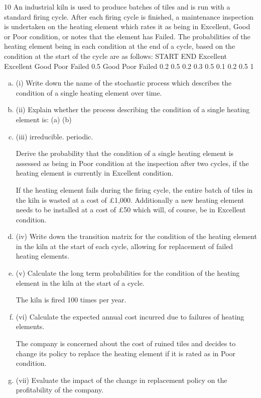 \documentclass[a4paper,12pt]{article}
\begin{document}
\begin{enumerate}
10
An industrial kiln is used to produce batches of tiles and is run with a standard firing cycle. After each firing cycle is finished, a maintenance inspection is undertaken on the heating element which rates it as being in Excellent, Good or Poor condition, or
notes that the element has Failed.
The probabilities of the heating element being in each condition at the end of a cycle,
based on the condition at the start of the cycle are as follows:
START
END
Excellent
Excellent
Good
Poor
Failed
0.5
Good Poor Failed
0.2
0.5 0.2
0.3
0.5 0.1
0.2
0.5
1

\begin{enumerate}[(a)]
\item (i) Write down the name of the stochastic process which describes the condition of a single heating element over time.

\item (ii) Explain whether the process describing the condition of a single heating
element is:
(a)
(b)
\item (iii)
irreducible.
periodic.

Derive the probability that the condition of a single heating element is assessed as being in Poor condition at the inspection after two cycles, if the heating element is currently in Excellent condition.

If the heating element fails during the firing cycle, the entire batch of tiles in the kiln is wasted at a cost of £1,000. Additionally a new heating element needs to be installed at a cost of £50 which will, of course, be in Excellent condition.
\item (iv) Write down the transition matrix for the condition of the heating element in the kiln at the start of each cycle, allowing for replacement of failed heating elements.
\item (v) Calculate the long term probabilities for the condition of the heating element in the kiln at the start of a cycle.

The kiln is fired 100 times per year.
\item (vi)
Calculate the expected annual cost incurred due to failures of heating
elements.

The company is concerned about the cost of ruined tiles and decides to change its policy to replace the heating element if it is rated as in Poor condition.
\item (vii)
Evaluate the impact of the change in replacement policy on the profitability of
the company.
\end{enumerate}
\newpage


\end{enumerate}
\end{document}
